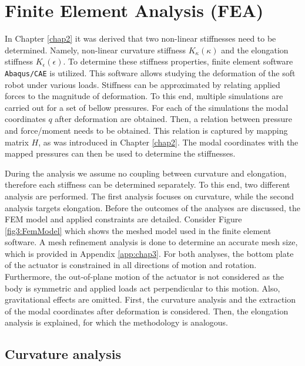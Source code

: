 
\section{Finite Element Analysis (FEA)}


In Chapter \ref{chap2} it was derived that two non-linear stiffnesses need to be determined. Namely, non-linear curvature stiffness $K_\kappa(\kappa)$ and the elongation stiffness $K_\epsilon(\epsilon)$. To determine these stiffness properties, finite element software \verb+Abaqus/CAE+ is utilized. This software allows studying the deformation of the soft robot under various loads. Stiffness can be approximated by relating applied forces to the magnitude of deformation. To this end, multiple simulations are carried out for a set of bellow pressures. For each of the simulations the modal coordinates $q$ after deformation are obtained. Then, a relation between pressure and force/moment needs to be obtained. This relation is captured by mapping matrix $H$, as was introduced in Chapter \ref{chap2}. The modal coordinates with the mapped pressures can then be used to determine the stiffnesses.

During the analysis we assume no coupling between curvature and elongation, therefore each stiffness can be determined separately. To this end, two different analysis are performed. The first analysis focuses on curvature, while the second analysis targets elongation. Before the outcomes of the analyses are discussed, the FEM model and applied constraints are detailed. Consider Figure \ref{fig3:FemModel} which shows the meshed model used in the finite element software. A mesh refinement analysis is done to determine an accurate mesh size, which is provided in Appendix \ref{app:chap3}. For both analyses, the bottom plate of the actuator is constrained in all directions of motion and rotation. Furthermore, the out-of-plane motion of the actuator is not considered as the body is symmetric and applied loads act perpendicular to this motion. Also, gravitational effects are omitted. First, the curvature analysis and the extraction of the modal coordinates after deformation is considered. Then, the elongation analysis is explained, for which the methodology is analogous. 


\subsection{Curvature analysis}

